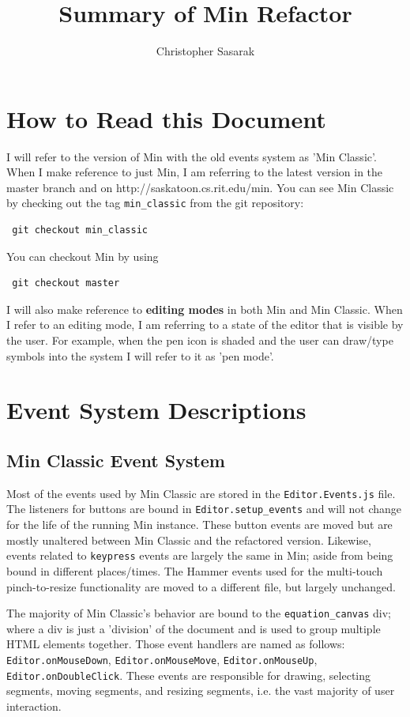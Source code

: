 \documentclass[letterpaper]{article}
\begin{document}
\author{Christopher Sasarak}
\title{Summary of Min Refactor}
\maketitle

\section*{How to Read this Document}

I will refer to the version of Min with the old events system as 'Min Classic'.
When I make reference to just Min, I am referring to the latest version in the
master branch and on http://saskatoon.cs.rit.edu/min.
You can see Min Classic by checking out the tag \verb+min_classic+ from the git
repository: \begin{verbatim} git checkout min_classic \end{verbatim} You can
checkout Min by using \begin{verbatim} git checkout master \end{verbatim}

I will also make reference to \textbf{editing modes} in both Min and Min Classic.
When I refer to an editing mode, I am referring to a state of the editor that is
visible by the user. For example, when the pen icon is shaded and the user can
draw/type symbols into the system I will refer to it as 'pen mode'.

\section*{Event System Descriptions}

\subsection*{Min Classic Event System} 
Most of the events used by Min Classic are stored in the \verb+Editor.Events.js+ file. 
The listeners for buttons are bound in \verb+Editor.setup_events+ and will not
change for the life of the running Min instance. These button events are moved
but are mostly unaltered between Min Classic and the refactored
version. Likewise, events related to \verb+keypress+ events are largely the
same in Min; aside from being bound in different places/times. The Hammer events
used for the multi-touch pinch-to-resize functionality are moved to a different
file, but largely unchanged.

The majority of Min Classic's behavior are bound to the \verb+equation_canvas+
div; where a div is just a 'division' of the document and is used to group multiple
HTML elements together. Those event handlers are named as follows:
\verb+Editor.onMouseDown+, \verb+Editor.onMouseMove+,
\verb+Editor.onMouseUp+, \verb+Editor.onDoubleClick+. These events are
responsible for drawing, selecting segments, moving segments, and resizing
segments, i.e. the vast majority of user interaction. 
\end{document}
